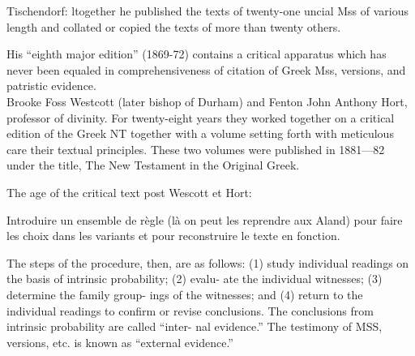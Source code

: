 Tischendorf: ltogether he published the
texts of twenty-one uncial Mss of various length and collated or
copied the texts of more than twenty others.

His “eighth
major edition” (1869-72) contains a critical apparatus which
has never been equaled in comprehensiveness of citation of
Greek Mss, versions, and patristic evidence. \\

Brooke Foss Westcott (later bishop of Durham) and Fenton John
Anthony Hort, professor of divinity. For twenty-eight years they
worked together on a critical edition of the Greek NT together
with a volume setting forth with meticulous care their textual
principles. These two volumes were published in 1881—82 under
the title, The New Testament in the Original Greek.

The age of the critical text post Wescott et Hort:

Introduire un ensemble de règle (là on peut les reprendre aux Aland) pour faire les choix dans les variants et pour reconstruire le texte en fonction.


The steps of the procedure, then, are as follows: (1) study
individual readings on the basis of intrinsic probability; (2) evalu-
ate the individual witnesses; (3) determine the family group-
ings of the witnesses; and (4) return to the individual readings
to confirm or revise conclusions.
The conclusions from intrinsic probability are called “inter-
nal evidence.” The testimony of MSS, versions, etc. is known as
“external evidence.”


